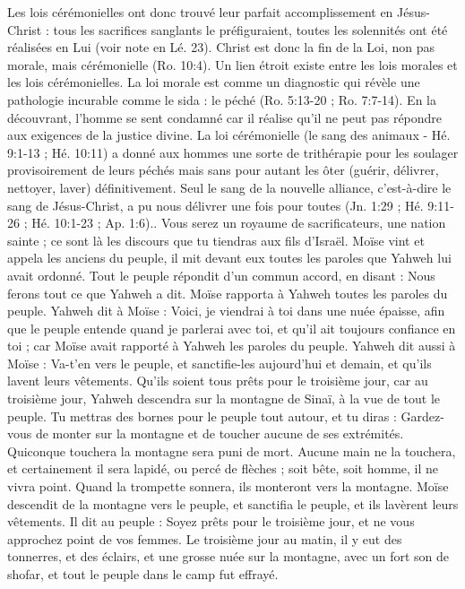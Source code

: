 \begin{multicols}{2}
{Les lois cérémonielles ont donc trouvé leur parfait accomplissement en Jésus-Christ : tous les sacrifices sanglants le préfiguraient, toutes les solennités ont été réalisées en Lui (voir note en Lé. 23). Christ est donc la fin de la Loi, non pas morale, mais cérémonielle (Ro. 10:4).
Un lien étroit existe entre les lois morales et les lois cérémonielles. La loi morale est comme un diagnostic qui révèle une pathologie incurable comme le sida : le péché (Ro. 5:13-20 ; Ro. 7:7-14). En la découvrant, l’homme se sent condamné car il réalise qu’il ne peut pas répondre aux exigences de la justice divine. La loi cérémonielle (le sang des animaux - Hé. 9:1-13 ; Hé. 10:11) a donné aux hommes une sorte de trithérapie pour les soulager provisoirement de leurs péchés mais sans pour autant les ôter (guérir, délivrer, nettoyer, laver) définitivement. Seul le sang de la nouvelle alliance, c’est-à-dire le sang de Jésus-Christ, a pu nous délivrer une fois pour toutes (Jn. 1:29 ; Hé. 9:11-26 ; Hé. 10:1-23 ; Ap. 1:6).}.
Vous serez un royaume de sacrificateurs, une nation sainte ; ce sont là les discours que tu tiendras aux fils d'Israël.
Moïse vint et appela les anciens du peuple, il mit devant eux toutes les paroles que Yahweh lui avait ordonné.
Tout le peuple répondit d'un commun accord, en disant : Nous ferons tout ce que Yahweh a dit. Moïse rapporta à Yahweh toutes les paroles du peuple.
Yahweh dit à Moïse : Voici, je viendrai à toi dans une nuée épaisse, afin que le peuple entende quand je parlerai avec toi, et qu'il ait toujours confiance en toi ; car Moïse avait rapporté à Yahweh les paroles du peuple.
Yahweh dit aussi à Moïse : Va-t'en vers le peuple, et sanctifie-les aujourd'hui et demain, et qu'ils lavent leurs vêtements.
Qu'ils soient tous prêts pour le troisième jour, car au troisième jour, Yahweh descendra sur la montagne de Sinaï, à la vue de tout le peuple.
Tu mettras des bornes pour le peuple tout autour, et tu diras : Gardez-vous de monter sur la montagne et de toucher aucune de ses extrémités. Quiconque touchera la montagne sera puni de mort.
Aucune main ne la touchera, et certainement il sera lapidé, ou percé de flèches ; soit bête, soit homme, il ne vivra point. Quand la trompette sonnera, ils monteront vers la montagne.
Moïse descendit de la montagne vers le peuple, et sanctifia le peuple, et ils lavèrent leurs vêtements.
Il dit au peuple : Soyez prêts pour le troisième jour, et ne vous approchez point de vos femmes.
Le troisième jour au matin, il y eut des tonnerres, et des éclairs, et une grosse nuée sur la montagne, avec un fort son de shofar, et tout le peuple dans le camp fut effrayé.

\end{multicols}
